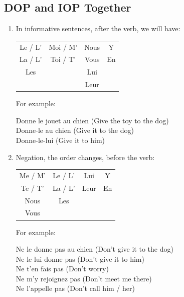 \documentclass{book}
\begin{document}
\subsection{DOP and IOP Together}
\begin{enumerate}
    \item In informative sentences, after the verb, we will have:
        \begin{center}
            \begin{tabular}{|c|c|c|c|}
                \hline
                Le / L' & Moi / M' & Nous & Y \\
                La / L' & Toi / T' & Vous & En \\
                Les & & Lui & \\
                & & Leur & \\
                \hline
            \end{tabular}
        \end{center}
        For example:
        \begin{center}
            Donne le jouet au chien (Give the toy to the dog) \\
            Donne-le au chien (Give it to the dog) \\
            Donne-le-lui (Give it to him)
        \end{center}

    \item Negation, the order changes, before the verb:
        \begin{center}
            \begin{tabular}{|c|c|c|c|}
                \hline
                Me / M' & Le / L' & Lui & Y \\
                Te / T' & La / L' & Leur & En \\
                Nous & Les & & \\
                Vous & & & \\
                \hline
            \end{tabular}
        \end{center}
        For example:
        \begin{center}
            Ne le donne pas au chien (Don't give it to the dog) \\
            Ne le lui donne pas (Don't give it to him) \\
            Ne t'en fais pas (Don't worry) \\
            Ne m'y rejoignez pas (Don't meet me there) \\
            Ne l'appelle pas (Don't call him / her)
        \end{center}
\end{enumerate}
\end{document}
